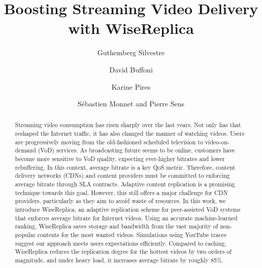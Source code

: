 \documentclass{llncs}
\begin{document}
\title{Boosting Streaming Video Delivery with WiseReplica}


\author{Guthemberg Silvestre \and David Buffoni \and  Karine Pires \and S\'{e}bastien Monnet and Pierre Sens}


\maketitle

\begin{abstract}

Streaming video consumption has risen sharply over the last years. Not only has that reshaped the Internet traffic, it has also changed the manner of watching videos. Users are progressively moving from the old-fashioned scheduled television to video-on-demand (VoD) services. As broadcasting future seems to be online, customers have become more sensitive to VoD quality, expecting ever-higher bitrates and lower rebuffering. In this context, average bitrate is a key QoS metric. Therefore, content delivery networks (CDNs) and content providers must be committed to enforcing average bitrate through SLA contracts. Adaptive content replication is a promising technique towards this goal. However, this still offers a major challenge for CDN providers, particularly as they aim to avoid waste of resources. In this work, we introduce WiseReplica, an adaptive replication scheme for peer-assisted VoD systems that enforces average bitrate for Internet videos. Using an accurate machine-learned ranking, WiseReplica saves storage and bandwidth from the vast majority of non-popular contents for the most wanted videos. Simulations using YouTube traces suggest our approach meets users expectations efficiently.  Compared to caching, WiseReplica reduces the replication degree for the hottest videos by two orders of magnitude, and under heavy load, it increases average bitrate by roughly 85\%.

\end{abstract}
\end{document}
